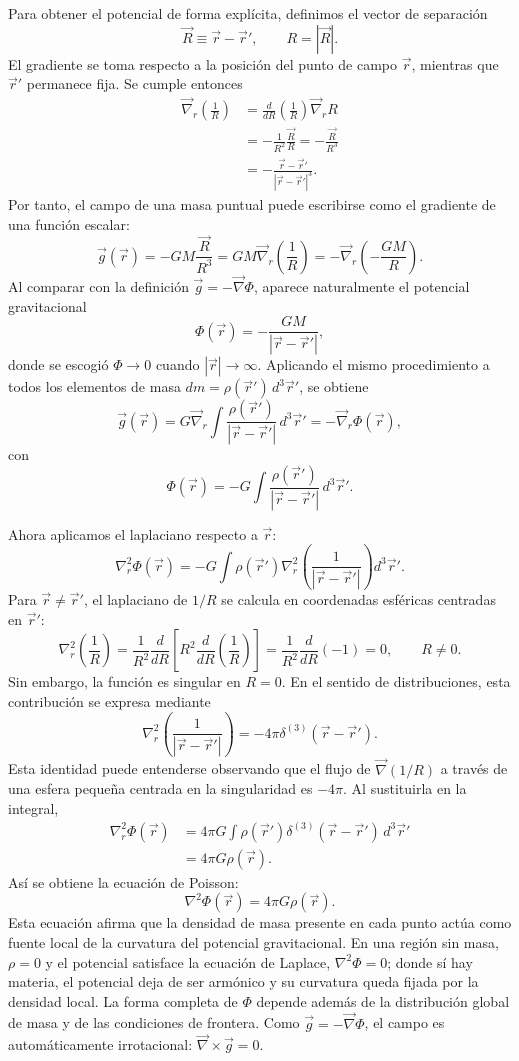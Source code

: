 Para obtener el potencial de forma explícita, definimos el vector de separación
$$
\vec{R}\equiv\vec{r}-\vec{r}',
\qquad R=|\vec{R}|.
$$
El gradiente se toma respecto a la posición del punto de campo $\vec{r}$, mientras que $\vec{r}'$ permanece fija. Se cumple entonces
$$
\begin{aligned}
\vec{\nabla}_{\!r}\left(\frac{1}{R}\right)
&=\frac{d}{dR}\left(\frac{1}{R}\right)
\vec{\nabla}_{\!r}R\\
&=-\frac{1}{R^2}\frac{\vec R}{R}
=-\frac{\vec{R}}{R^3}\\
&=-\frac{\vec{r}-\vec{r}'}{|\vec{r}-\vec{r}'|^3}.
\end{aligned}
$$
Por tanto, el campo de una masa puntual puede escribirse como el gradiente de una función escalar:
$$
\vec{g}(\vec{r})
=-GM\frac{\vec{R}}{R^3}
=GM\vec{\nabla}_{\!r}\left(\frac{1}{R}\right)
=-\vec{\nabla}_{\!r}\left(-\frac{GM}{R}\right).
$$
Al comparar con la definición $\vec{g}=-\vec{\nabla}\Phi$, aparece naturalmente el potencial gravitacional
$$
\Phi(\vec{r})=-\frac{GM}{|\vec{r}-\vec{r}'|},
$$
donde se escogió $\Phi\to0$ cuando $|\vec{r}|\to\infty$. Aplicando el mismo procedimiento a todos los elementos de masa $dm=\rho(\vec{r}')\,d^3\vec{r}'$, se obtiene
$$
\vec{g}(\vec{r})
=G\vec{\nabla}_{\!r}
\int\frac{\rho(\vec{r}')}{|\vec{r}-\vec{r}'|}\,d^3\vec{r}'
=-\vec{\nabla}_{\!r}\Phi(\vec{r}),
$$
con
$$
\Phi(\vec{r})
=-G\int\frac{\rho(\vec{r}')}{|\vec{r}-\vec{r}'|}\,d^3\vec{r}'.
$$

Ahora aplicamos el laplaciano respecto a $\vec{r}$:
$$
\nabla_r^2\Phi(\vec{r})
=-G\int \rho(\vec{r}')
\nabla_r^2\left(\frac{1}{|\vec{r}-\vec{r}'|}\right)d^3\vec{r}'.
$$
Para $\vec{r}\neq\vec{r}'$, el laplaciano de $1/R$ se calcula en coordenadas esféricas centradas en $\vec r'$:
$$
\nabla_r^2\left(\frac{1}{R}\right)
=\frac{1}{R^2}\frac{d}{dR}
\left[R^2\frac{d}{dR}\left(\frac{1}{R}\right)\right]
=\frac{1}{R^2}\frac{d}{dR}(-1)=0,
\qquad R\neq0.
$$
Sin embargo, la función es singular en $R=0$. En el sentido de distribuciones, esta contribución se expresa mediante
$$
\nabla_r^2\left(\frac{1}{|\vec{r}-\vec{r}'|}\right)
=-4\pi\delta^{(3)}(\vec{r}-\vec{r}').
$$
Esta identidad puede entenderse observando que el flujo de $\vec{\nabla}(1/R)$ a través de una esfera pequeña centrada en la singularidad es $-4\pi$. Al sustituirla en la integral,
$$
\begin{aligned}
\nabla_r^2\Phi(\vec{r})
&=4\pi G\int\rho(\vec{r}')
\delta^{(3)}(\vec{r}-\vec{r}')\,d^3\vec{r}'\\
&=4\pi G\rho(\vec{r}).
\end{aligned}
$$
Así se obtiene la ecuación de Poisson:
$$
\boxed{\nabla^2\Phi(\vec{r})=4\pi G\rho(\vec{r})}.
$$
Esta ecuación afirma que la densidad de masa presente en cada punto actúa como fuente local de la curvatura del potencial gravitacional. En una región sin masa, $\rho=0$ y el potencial satisface la ecuación de Laplace, $\nabla^2\Phi=0$; donde sí hay materia, el potencial deja de ser armónico y su curvatura queda fijada por la densidad local. La forma completa de $\Phi$ depende además de la distribución global de masa y de las condiciones de frontera. Como $\vec{g}=-\vec{\nabla}\Phi$, el campo es automáticamente irrotacional: $\vec{\nabla}\times\vec{g}=0$.

